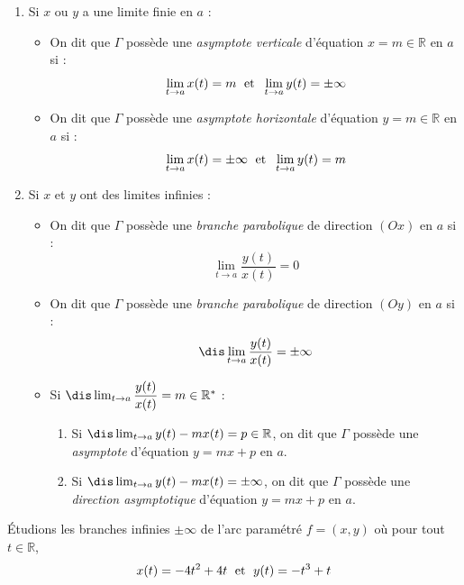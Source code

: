 \documentclass[a4paper,10pt]{report}
\begin{document}
 \begin{enumerate}
 \item Si $x$ ou $y$ a une limite finie en $a$ :
 \begin{itemize}
 \item On dit que $\Gamma$ possède une \textit{asymptote verticale} d'équation $x=m \in \mathbb{R}$ en $a$ si :
 $$ \lim_{t \rightarrow a} x(t)=m \; \hbox{ et } \; \lim_{t \rightarrow a} y(t) =\pm  \infty $$
  \item On dit que $\Gamma$ possède une \textit{asymptote horizontale} d'équation $y=m \in \mathbb{R}$ en $a$ si :
 $$ \lim_{t \rightarrow a} x(t)=\pm \infty \; \hbox{ et } \; \lim_{t \rightarrow a} y(t) = m$$
 \end{itemize}
 \item Si $x$ et $y$ ont des limites infinies :
 \begin{itemize}
 \item On dit que $\Gamma$ possède une \textit{branche parabolique} de direction $(Ox)$ en $a$ si :
 $$ \lim_{t \rightarrow a} \dfrac{y(t)}{x(t)} = 0$$
 \item  On dit que $\Gamma$ possède une \textit{branche parabolique} de direction $(Oy)$ en $a$ si :
 $$ \dis \lim_{t \rightarrow a} \dfrac{y(t)}{x(t)} = \pm \infty$$
 \item Si $\dis \lim_{t \rightarrow a} \dfrac{y(t)}{x(t)} = m \in \mathbb{R}^*$ :
 \begin{enumerate}
 \item Si $\dis \lim_{t \rightarrow a} y(t)-mx(t) = p \in \mathbb{R}$, on dit que $\Gamma$ possède une \textit{asymptote} d'équation $y=mx+p$ en $a$.
  \item Si $\dis \lim_{t \rightarrow a} y(t)-mx(t) = \pm \infty$, on dit que $\Gamma$ possède une \textit{direction asymptotique} d'équation $y=mx+p$ en $a$.
 \end{enumerate}
 \end{itemize}
 \end{enumerate}
 
\begin{ex} Étudions les branches infinies $\pm \infty$ de l'arc paramétré $f=(x,y)$ où pour tout $t \in \mathbb{R}$,
$$ x(t) = -4t^2+4t \; \hbox{ et } \; y(t)=-t^3+t$$

\vspace{5cm}
\end{ex}

%
\end{document}
